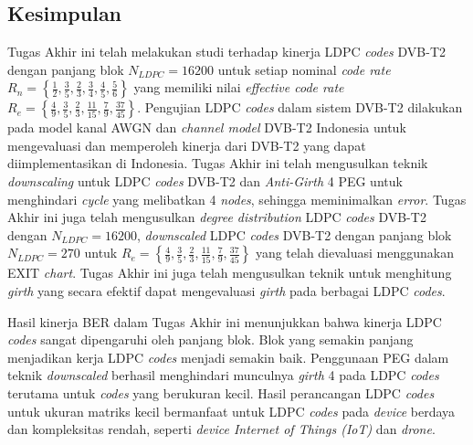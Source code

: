 \chapter{\babLima}

\section{Kesimpulan}
Tugas Akhir ini telah melakukan studi terhadap kinerja LDPC \textit{codes} DVB-T2 dengan panjang blok $N_{LDPC}=16200$ untuk setiap nominal \textit{code rate} $R_n=\left \{\frac{1}{2}, \frac{3}{5}, \frac{2}{3}, \frac{3}{4}, \frac{4}{5}, \frac{5}{6} \right \}$ yang memiliki nilai \textit{effective code rate} $R_e=\left \{ \frac{4}{9}, \frac{3}{5}, \frac{2}{3},\frac{11}{15},\frac{7}{9},\frac{37}{45} \right \}$. Pengujian LDPC \textit{codes} dalam sistem DVB-T2 dilakukan pada model kanal AWGN dan \textit{channel model} DVB-T2 Indonesia untuk mengevaluasi dan memperoleh kinerja dari DVB-T2 yang dapat diimplementasikan di Indonesia. Tugas Akhir ini telah mengusulkan teknik \textit{downscaling} untuk LDPC \textit{codes} DVB-T2 dan \textit{Anti-Girth} 4 PEG untuk menghindari \textit{cycle} yang melibatkan 4 \textit{nodes}, sehingga meminimalkan \textit{error}. Tugas Akhir ini juga telah mengusulkan \textit{degree distribution} LDPC \textit{codes} DVB-T2 dengan $N_{LDPC}=16200$, \textit{downscaled} LDPC \textit{codes} DVB-T2 dengan panjang blok $N_{LDPC}=270$ untuk $R_e=\left \{ \frac{4}{9}, \frac{3}{5}, \frac{2}{3},\frac{11}{15},\frac{7}{9},\frac{37}{45} \right \}$ yang telah dievaluasi menggunakan EXIT \textit{chart}. Tugas Akhir ini juga telah mengusulkan teknik untuk menghitung \textit{girth} yang secara efektif dapat mengevaluasi \textit{girth} pada berbagai LDPC \textit{codes}.


Hasil kinerja BER dalam Tugas Akhir ini menunjukkan bahwa kinerja LDPC \textit{codes} sangat dipengaruhi oleh panjang blok. Blok yang semakin panjang menjadikan kerja LDPC \textit{codes} menjadi semakin baik. Penggunaan PEG dalam teknik \textit{downscaled} berhasil menghindari munculnya \textit{girth} 4 pada LDPC \textit{codes} terutama untuk \textit{codes} yang berukuran kecil. Hasil perancangan LDPC \textit{codes} untuk ukuran matriks kecil bermanfaat untuk LDPC \textit{codes} pada \textit{device} berdaya dan kompleksitas rendah, seperti \textit{device Internet of Things (IoT)} dan \textit{drone}. 


